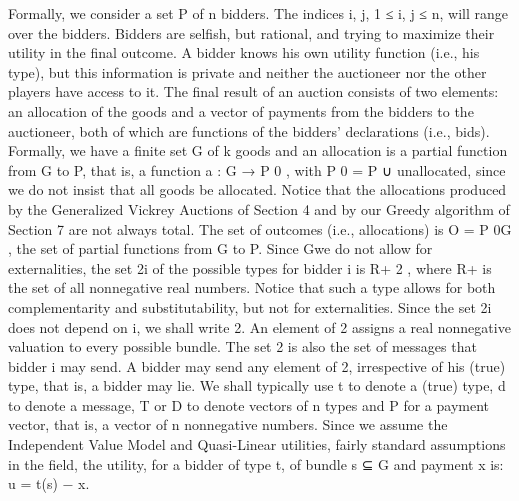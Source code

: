 \documentclass[10pt]{article}
\begin{document}
\begin{ReviewVerbatim}
Formally, we consider a set P of n bidders. The indices i, j, 1 ≤ i, j ≤ n, will
range over the bidders. Bidders are selfish, but rational, and trying to maximize their
utility in the final outcome. A bidder knows his own utility function (i.e., his type),
but this information is private and neither the auctioneer nor the other players have
access to it. The final result of an auction consists of two elements: an allocation
of the goods and a vector of payments from the bidders to the auctioneer, both of
which are functions of the bidders’ declarations (i.e., bids). Formally, we have a
finite set G of k goods and an allocation is a partial function from G to P, that is, a
function a : G → P 0 , with P 0 = P ∪ {unallocated}, since we do not insist that all
goods be allocated. Notice that the allocations produced by the Generalized Vickrey
Auctions of Section 4 and by our Greedy algorithm of Section 7 are not always
total. The set of outcomes (i.e., allocations) is O = P 0G , the set of partial functions
from G to P. Since Gwe do not allow for externalities, the set 2i of the possible types
for bidder i is R+ 2 , where R+ is the set of all nonnegative real numbers. Notice
that such a type allows for both complementarity and substitutability, but not for
externalities. Since the set 2i does not depend on i, we shall write 2. An element
of 2 assigns a real nonnegative valuation to every possible bundle. The set 2 is
also the set of messages that bidder i may send. A bidder may send any element of
2, irrespective of his (true) type, that is, a bidder may lie. We shall typically use t
to denote a (true) type, d to denote a message, T or D to denote vectors of n types
and P for a payment vector, that is, a vector of n nonnegative numbers.
Since we assume the Independent Value Model and Quasi-Linear utilities, fairly
standard assumptions in the field, the utility, for a bidder of type t, of bundle s ⊆ G
and payment x is:
u = t(s) − x.
\end{ReviewVerbatim}
\end{document}
